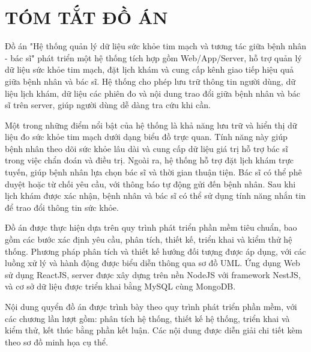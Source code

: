 \section*{TÓM TẮT ĐỒ ÁN}

Đồ án "Hệ thống quản lý dữ liệu sức khỏe tim mạch và tương tác giữa bệnh nhân - bác sĩ" phát triển một hệ thống tích hợp gồm Web/App/Server, hỗ trợ quản lý dữ liệu sức khỏe tim mạch, đặt lịch khám và cung cấp kênh giao tiếp hiệu quả giữa bệnh nhân và bác sĩ.
Hệ thống cho phép lưu trữ thông tin người dùng, dữ liệu lịch khám, dữ liệu các phiên đo và nội dung trao đổi giữa bệnh nhân và bác sĩ trên server, giúp người dùng dễ dàng tra cứu khi cần.

Một trong những điểm nổi bật của hệ thống là khả năng lưu trữ và hiển thị dữ liệu đo sức khỏe tim mạch dưới dạng biểu đồ trực quan. Tính năng này giúp bệnh nhân theo dõi sức khỏe lâu dài và cung cấp dữ liệu giá trị hỗ trợ bác sĩ trong việc chẩn đoán và điều trị.
Ngoài ra, hệ thống hỗ trợ đặt lịch khám trực tuyến, giúp bệnh nhân lựa chọn bác sĩ và thời gian thuận tiện. Bác sĩ có thể phê duyệt hoặc từ chối yêu cầu, với thông báo tự động gửi đến bệnh nhân. Sau khi lịch khám được xác nhận, bệnh nhân và bác sĩ có thể sử dụng tính năng nhắn tin để trao đổi thông tin sức khỏe.

Đồ án được thực hiện dựa trên quy trình phát triển phần mềm tiêu chuẩn, bao gồm các bước xác định yêu cầu, phân tích, thiết kế, triển khai và kiểm thử hệ thống. Phương pháp phân tích và thiết kế hướng đối tượng được áp dụng, với các luồng xử lý và hành động được biểu diễn thông qua sơ đồ UML.
Ứng dụng Web sử dụng ReactJS, server được xây dựng trên nền NodeJS với framework NestJS, và cơ sở dữ liệu được triển khai bằng MySQL cùng MongoDB.

Nội dung quyển đồ án được trình bày theo quy trình phát triển phần mềm, với các chương lần lượt gồm: phân tích hệ thống, thiết kế hệ thống, triển khai và kiểm thử, kết thúc bằng phần kết luận. Các nội dung được diễn giải chi tiết kèm theo sơ đồ minh họa cụ thể.

\cleardoublepage



